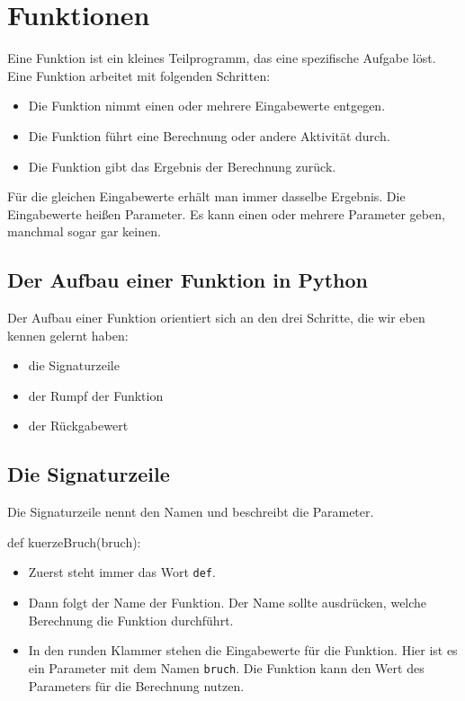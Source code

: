 \section{Funktionen}

Eine Funktion ist ein kleines Teilprogramm, das eine spezifische Aufgabe löst. Eine Funktion arbeitet mit folgenden Schritten:
\begin{itemize}
	\item Die Funktion nimmt einen oder mehrere Eingabewerte entgegen.
	\item Die Funktion führt eine Berechnung oder andere Aktivität durch.
	\item Die Funktion gibt das Ergebnis der Berechnung zurück.
\end{itemize}

Für die gleichen Eingabewerte erhält man immer dasselbe Ergebnis. Die Eingabewerte heißen Parameter. Es kann einen oder mehrere Parameter geben, manchmal sogar gar keinen.

\subsection*{Der Aufbau einer Funktion in Python}

Der Aufbau einer Funktion orientiert sich an den drei Schritte, die wir eben kennen gelernt haben:
\begin{itemize}
	\item die Signaturzeile
	\item der Rumpf der Funktion 
	\item der Rückgabewert
\end{itemize}

\subsection*{Die Signaturzeile}

Die Signaturzeile nennt den Namen und beschreibt die Parameter.
\begin{codePython}
def kuerzeBruch(bruch):
\end{codePython}

\begin{itemize}
	\item Zuerst steht immer das Wort \texttt{def}.
	\item Dann folgt der Name der Funktion. Der Name sollte ausdrücken, welche Berechnung die Funktion durchführt.
	\item In den runden Klammer stehen die Eingabewerte für die Funktion. Hier ist es ein Parameter mit dem Namen \texttt{bruch}. Die Funktion kann den Wert des Parameters für die Berechnung nutzen.
\end{itemize}

